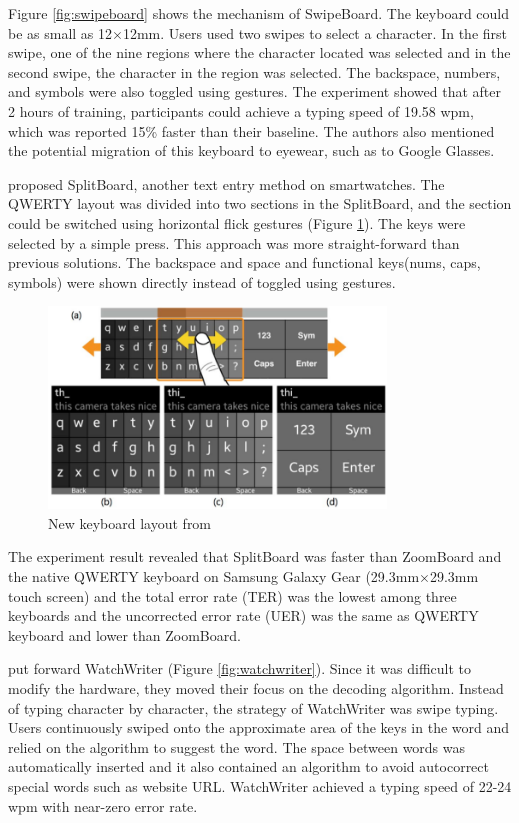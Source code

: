 \documentclass[11pt]{article}
\begin{document}
Figure \ref{fig:swipeboard} shows the mechanism of SwipeBoard. The keyboard could be as small as 12$\times$12mm. Users used two swipes to select a character. In the first swipe, one of the nine regions where the character located was selected and in the second swipe, the character in the region was selected. The backspace, numbers, and symbols were also toggled using gestures. The experiment showed that after 2 hours of training, participants could achieve a typing speed of 19.58 wpm, which was reported 15\% faster than their baseline. The authors also mentioned the potential migration of this keyboard to eyewear, such as to Google Glasses.

\citet{10.1145/2702123.2702273} proposed SplitBoard, another text entry method on smartwatches. The QWERTY layout was divided into two sections in the SplitBoard, and the section could be switched using horizontal flick gestures (Figure \ref{fig:splitboard}). The keys were selected by a simple press. This approach was more straight-forward than previous solutions. The backspace and space and functional keys(nums, caps, symbols) were shown directly instead of toggled using gestures.

\begin{figure}[H]
  \centering
  \includegraphics[width=0.8\textwidth]{SplitBoard.png}
  \caption{New keyboard layout from \citep{10.1145/2702123.2702273}}
  \label{fig:splitboard}
\end{figure}

The experiment result revealed that SplitBoard was faster than ZoomBoard and the native QWERTY keyboard on Samsung Galaxy Gear (29.3mm$\times$29.3mm touch screen) and the total error rate (TER) was the lowest among three keyboards and the uncorrected error rate (UER) was the same as QWERTY keyboard and lower than ZoomBoard.

\citet{10.1145/2858036.2858242} put forward WatchWriter (Figure \ref{fig:watchwriter}). Since it was difficult to modify the hardware, they moved their focus on the decoding algorithm. Instead of typing character by character, the strategy of WatchWriter was swipe typing. Users continuously swiped onto the approximate area of the keys in the word and relied on the algorithm to suggest the word. The space between words was automatically inserted and it also contained an algorithm to avoid autocorrect special words such as website URL. WatchWriter achieved a typing speed of 22-24 wpm with near-zero error rate.
\end{document}
